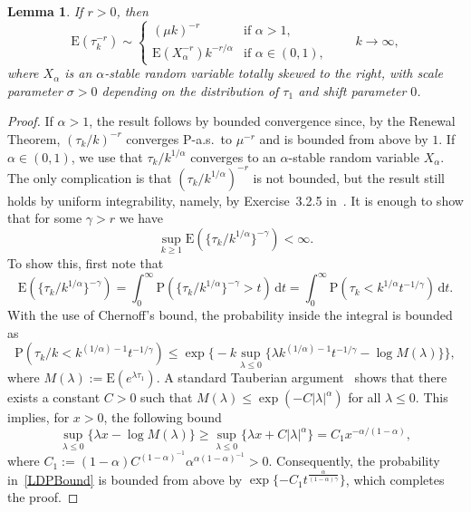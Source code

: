 \documentclass[10pt]{amsart}
\newtheorem{lemm}[theo]{Lemma}\newtheorem{prop}[theo]{Proposition}\newtheorem{coro}[theo]{Corollary}\newtheorem{conj}[theo]{Conjecture}
\theoremstyle{definition}\newtheorem{defi}[theo]{Definition}\newtheorem{rema}[theo]{Remark}\newtheorem{exam}[theo]{Example}\newtheorem{exem}[theo]{Example}\newtheorem{nota}[theo]{Notation}
\newcommand{\ga}{\alpha}
\newcommand{\gga}{\gamma}
\newcommand{\gl}{\lambda}
\newcommand{\gs}{\sigma}
\newcommand{\dd}{\mathrm{d}}
\newcommand\bP{\ensuremath{\mathrm{P}}}
\newcommand\bE{\ensuremath{\mathrm{E}}}
\begin{document}
\begin{lemm}\label{lem:conv.power.tauk}
If $r > 0$, then
\begin{equation}
\bE(\tau_k^{- r}) \sim
\begin{cases}
(\mu k)^{- r} & \text{if } \ga > 1,\\[4pt]
\bE(X_\ga^{- r}) k^{- r/\ga} & \text{if } \ga \in (0,1),
\end{cases}
\qquad k \to \infty,
\end{equation}
where $X_\ga$ is an $\ga$-stable random variable totally skewed to the right, with scale parameter $\gs > 0$ depending on the distribution of $\tau_1$ and shift parameter $0$.
\end{lemm}

\begin{proof}
If $\ga > 1$, the result follows by bounded convergence since, by the Renewal Theorem, $(\tau_k/k)^{- r}$ converges $\bP$-a.s.~to $\mu^{- r}$ and is bounded from above by $1$. If $\ga \in (0,1)$, we use that $\tau_k/k^{1/\ga}$ converges to an $\ga$-stable random variable $X_\ga$. The only complication is that $(\tau_k/k^{1/\ga})^{- r}$ is not bounded, but the result still holds by uniform integrability, namely, by Exercise~3.2.5 in~\cite{Du10}. It is enough to show that for some $\gga > r$ we have
\begin{equation}\label{eq:UItau}
\sup_{k\geq1} \bE(\{\tau_k/k^{1/\ga}\}^{- \gga}) < \infty.
\end{equation}
To show this, first note that
\begin{equation}\label{ExpectationTail}
\bE(\{\tau_k/k^{1/\ga}\}^{- \gga}) = \int_0^\infty \bP(\{\tau_k/k^{1/\ga}\}^{- \gga} > t) \, \dd t = \int_0^\infty \bP(\tau_k < k^{1/\ga} t^{- 1/\gga}) \, \dd t.
\end{equation}
With the use of Chernoff's bound, the probability inside the integral is bounded as
\begin{equation}\label{LDPBound}
\bP(\tau_k/k < k^{(1/\ga) - 1} t^{- 1/\gga}) \leq \exp \Big\{ - k \sup_{\gl\leq0} \{\gl k^{(1/\ga) - 1} t^{- 1/\gga} - \log M(\gl)\} \Big\},
\end{equation}
where $M(\gl) := \bE(e^{\gl \tau_1})$. A standard Tauberian argument~\cite[(5.22) of Chapter~XIII]{Feller71} shows that there exists a constant $C > 0$ such that $M(\gl) \leq \exp({- C |\gl|^\ga})$ for all $\gl \leq 0$. This implies, for $x > 0$, the following bound
\begin{equation}
\sup_{\gl\leq0} \{\gl x - \log M(\gl)\} \geq \sup_{\gl\leq0} \{\gl x + C |\gl|^\ga\} = C_1 x^{- \ga/(1 - \ga)},
\end{equation}
where $C_1 := (1 - \ga) C^{(1 - \ga)^{-1}} \ga^{\ga (1 - \ga)^{-1}} > 0$. Consequently, the probability in~\eqref{LDPBound} is bounded from above by $\exp\{- C_1 t^\frac{\ga}{(1 - \ga) \gga}\}$, which completes the proof.
\end{proof}
\end{document}
